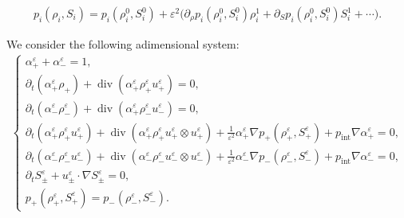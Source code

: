\documentclass[10pt,a4paper]{amsart}
\newcommand{\am}{\alpha_-}
\newcommand{\ap}{\alpha_+}
\renewcommand{\div}{\operatorname{div}}
\newcommand{\dt}{\partial_t}
\newcommand{\eps}{\varepsilon}
\newcommand{\rmi}{\rho_-}
\newcommand{\rp}{\rho_+}
\begin{document}
\begin{align}
    p_i(\rho_i,S_i) = p_i(\rho_i^0,S_i^0) + \eps^2 \Big( \partial_\rho p_i(\rho_i^0,S_i^0) \rho_i^1 + \partial_S p_i(\rho_i^0,S_i^0) S_i^1 + \cdots \Big).\label{expp}
\end{align}

We consider the following adimensional system:
\begin{align}
    \left\{
        \begin{array}{l}\label{PDE2veleps}
            \ap^\eps + \am^\eps = 1,\\
            \dt (\ap^\eps \rp) + \div(\ap^\eps \rp^\eps u_+^\eps) = 0,\\
            \dt (\am^\eps \rmi^\eps) + \div(\ap^\eps \rmi^\eps u_-^\eps) = 0,\\
            \dt (\ap^\eps \rp^\eps u_+^\eps) + \div (\ap^\eps \rp^\eps u_+^\eps \otimes u_+^\eps) + \frac{1}{\eps^2} \ap^\eps \nabla p_+(\rp^\eps, S_+^\eps) + p_{\mathrm{int}} \nabla \ap^\eps = 0,\\
            \dt (\am^\eps \rmi^\eps u_-^\eps) + \div (\am^\eps \rmi^\eps u_-^\eps \otimes u_-^\eps) + \frac{1}{\eps^2} \am^\eps \nabla p_-(\rmi^\eps, S_-^\eps) + p_{\mathrm{int}} \nabla \am^\eps = 0,\\
            \dt S_\pm^\eps + u_\pm^\eps \cdot \nabla S_\pm^\eps = 0,\\
            p_+(\rp^\eps, S_+^\eps) = p_-(\rmi^\eps, S_-^\eps).
        \end{array}
    \right.
\end{align}
\end{document}
